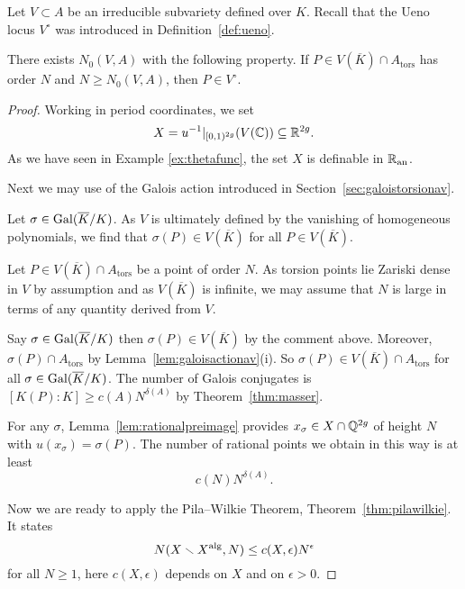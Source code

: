 Let $V\subset A$ be an irreducible subvariety defined over $K$. Recall
that the Ueno locus $V^{\circ}$ was introduced  in Definition~\ref{def:ueno}.

\begin{lemma}
  \label{lem:apppw}
  There exists $N_0(V,A)$ with the following property. If
  $P\in V(\overline K)\cap A_{\mathrm{tors}}$ has order $N$
  and $N\ge N_0(V,A)$, then $P\in V^{\circ}$.
\end{lemma}
\begin{proof}

  Working in period coordinates, we set
  \begin{equation*}
    X = u^{-1}|_{[0,1)^{2g}}(V({\mathbb{C}})) \subseteq {\mathbb{R}}^{2g}.
  \end{equation*}
  As we have seen in Example \ref{ex:thetafunc},
  the set $X$ is definable in ${{\mathbb{R}}_{\mathrm{an}}}$. 


  Next we may use of the Galois action introduced in
  Section~\ref{sec:galoistorsionav}.

  Let $\sigma\in \mathrm{Gal}(\overline{K}/K)$. As $V$ is ultimately defined by the
  vanishing of homogeneous polynomials, we find that $\sigma(P)\in
  V(\overline K)$ for all $P\in V(\overline K)$.

  Let $P\in V(\overline K) \cap A_{\mathrm{tors}}$ be a point of order
  $N$. As torsion points lie Zariski dense in $V$ by assumption and as
  $V(\overline K)$ is infinite, we may assume that $N$ is large in terms
  of any quantity derived from $V$.

  Say $\sigma\in \mathrm{Gal}(\overline{K}/K)$ then $\sigma(P)\in V(\overline K)$ by the
  comment above. Moreover, $\sigma(P)\cap A_{\mathrm{tors}}$ by
  Lemma~\ref{lem:galoisactionav}(i). So $\sigma(P) \in V(\overline
  K)\cap A_{\mathrm{tors}}$ for all $\sigma\in \mathrm{Gal}(\overline{K}/K)$. The number of
  Galois conjugates is $[K(P):K]\ge c(A) N^{\delta(A)}$ by
  Theorem~\ref{thm:masser}. 

  For any $\sigma$, Lemma~\ref{lem:rationalpreimage} provides $x_\sigma
  \in X\cap{\mathbb{Q}}^{2g}$ of height $N$ with $u(x_\sigma) = \sigma(P)$. The
  number of rational points we obtain in this way is at least
  \begin{equation}
    \label{eq:rtlptub}
    c(N) N^{\delta(A)}. 
  \end{equation}

  Now we are ready to apply the Pila--Wilkie Theorem,
  Theorem~\ref{thm:pilawilkie}. It states
  \begin{equation}
    \label{eq:rtlptlb}
    N(X\smallsetminus X^{\mathrm{alg}},N) \le
    c(X,\epsilon)N^\epsilon 
  \end{equation}
  for all $N\ge 1$, here $c(X,\epsilon)$ depends on $X$ and on $\epsilon
  > 0$.


\end{proof}
